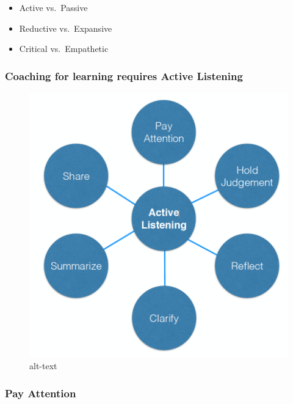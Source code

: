\documentclass[
]{book}
\providecommand{\tightlist}{%
  \setlength{\itemsep}{0pt}\setlength{\parskip}{0pt}}
\begin{document}
\begin{itemize}
\tightlist
\item
  Active vs.~Passive
\item
  Reductive vs.~Expansive
\item
  Critical vs.~Empathetic
\end{itemize}

\hypertarget{coaching-for-learning-requires-active-listening}{%
\subsubsection*{Coaching for learning requires Active Listening}\label{coaching-for-learning-requires-active-listening}}

\begin{figure}
\centering
\includegraphics{assets/presentations/coaching/active.png}
\caption{alt-text}
\end{figure}

\hypertarget{pay-attention}{%
\subsubsection*{Pay Attention}\label{pay-attention}}
\end{document}
